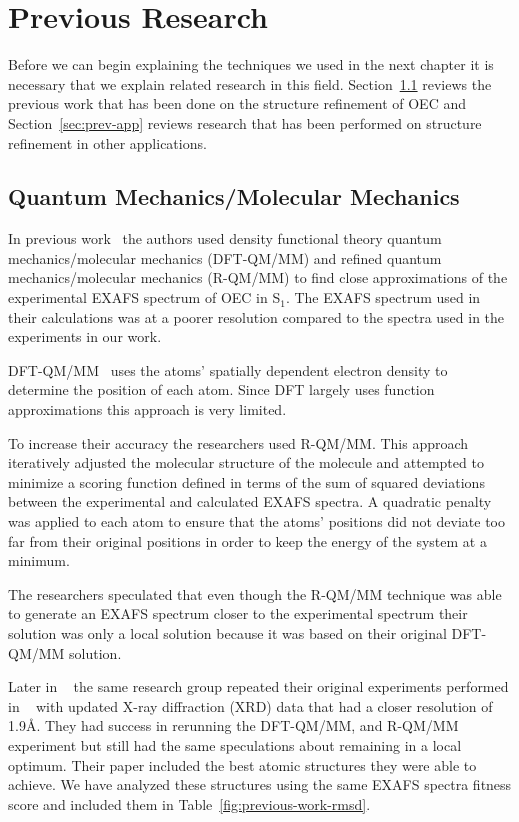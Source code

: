 \chapter{Previous Research}

Before we can begin explaining the techniques we used in the next chapter it is necessary that we explain related research in this field. Section~\ref{sec:prev-work} reviews the previous work that has been done on the structure refinement of OEC and Section~\ref{sec:prev-app} reviews research that has been performed on structure refinement in other applications.

\section{Quantum Mechanics/Molecular Mechanics}
\label{sec:prev-work}

In previous work~\cite{sproviero2008model} the authors used density functional theory quantum mechanics/molecular mechanics (DFT-QM/MM) and refined quantum mechanics/molecular mechanics (R-QM/MM) to find close approximations of the experimental EXAFS spectrum of OEC in S$_{1}$. The EXAFS spectrum used in their calculations was at a poorer resolution compared to the spectra used in the experiments in our work.

DFT-QM/MM~\cite{parr1989density} uses the atoms' spatially dependent electron density to determine the position of each atom. Since DFT largely uses function approximations this approach is very limited.

To increase their accuracy the researchers used R-QM/MM. This approach iteratively adjusted the molecular structure of the molecule and attempted to minimize a scoring function defined in terms of the sum of squared deviations between the experimental and calculated EXAFS spectra. A quadratic penalty was applied to each atom to ensure that the atoms' positions did not deviate too far from their original positions in order to keep the energy of the system at a minimum.

The researchers speculated that even though the R-QM/MM technique was able to generate an EXAFS spectrum closer to the experimental spectrum their solution was only a local solution because it was based on their original DFT-QM/MM solution.

Later in ~\cite{luber2011s1} the same research group repeated their original experiments performed in ~\cite{sproviero2008model} with updated X-ray diffraction (XRD) data that had a closer resolution of 1.9\AA. They had success in rerunning the DFT-QM/MM, and R-QM/MM experiment but still had the same speculations about remaining in a local optimum. Their paper included the best atomic structures they were able to achieve. We have analyzed these structures using the same EXAFS spectra fitness score and included them in Table~\ref{fig:previous-work-rmsd}.

